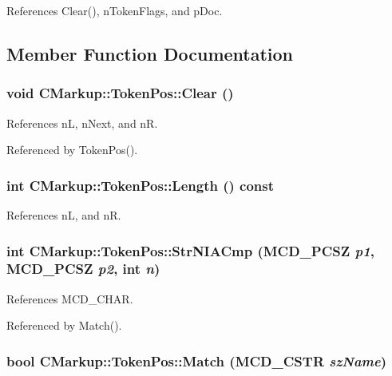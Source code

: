 References Clear(), nTokenFlags, and pDoc.

\subsection{Member Function Documentation}
\subsubsection[Clear]{\setlength{\rightskip}{0pt plus 5cm}void CMarkup::TokenPos::Clear ()\hspace{0.3cm}{\tt  [inline]}}\label{structCMarkup_1_1TokenPos_cb390ed8ab1226cbd8c9b9a19088d55c}




References nL, nNext, and nR.

Referenced by TokenPos().
\subsubsection[Length]{\setlength{\rightskip}{0pt plus 5cm}int CMarkup::TokenPos::Length () const\hspace{0.3cm}{\tt  [inline]}}\label{structCMarkup_1_1TokenPos_b033dc8e88a8f83748ff6c44df05bb04}




References nL, and nR.
\subsubsection[StrNIACmp]{\setlength{\rightskip}{0pt plus 5cm}int CMarkup::TokenPos::StrNIACmp (MCD\_\-PCSZ {\em p1}, \/  MCD\_\-PCSZ {\em p2}, \/  int {\em n})\hspace{0.3cm}{\tt  [inline]}}\label{structCMarkup_1_1TokenPos_c3a37f7294cd763aed0f37749095d3db}




References MCD\_\-CHAR.

Referenced by Match().
\subsubsection[Match]{\setlength{\rightskip}{0pt plus 5cm}bool CMarkup::TokenPos::Match ({\bf MCD\_\-CSTR} {\em szName})\hspace{0.3cm}{\tt  [inline]}}\label{structCMarkup_1_1TokenPos_199e0772dc846b95670797f0a32ec9ab}




